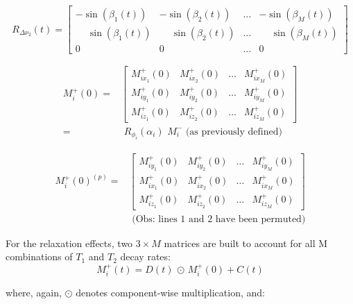 \begin{equation}
    R_{\Delta \nu_2}(t)  = \begin{bmatrix} -\sin(\beta_{1}(t) ) & -\sin(\beta_{2}(t) ) & \dots & -\sin(\beta_{M}(t) ) \\
    \phantom{-}\sin(\beta_{1}(t) ) & \phantom{-}\sin(\beta_{2}(t) ) & \dots & \phantom{-}\sin(\beta_{M}(t) ) \\
    0     &      0      & \dots &      0
    \end{bmatrix}
\end{equation}

\begin{equation}
\begin{split}
    M^{+}_i(0) = &
    \begin{bmatrix}
        M^{+}_{ix_1}(0) & M^{+}_{ix_2}(0) & \dots & M^{+}_{ix_M}(0) \\
        M^{+}_{iy_1}(0) & M^{+}_{iy_2}(0) & \dots & M^{+}_{iy_M}(0) \\
        M^{+}_{iz_1}(0) & M^{+}_{iz_2}(0) & \dots & M^{+}_{iz_M}(0)
    \end{bmatrix} \\
    = & \, \, R_{\phi_i}(\alpha_i) \, \, M^{-}_i \text{ (as previously defined)}
\end{split}
\end{equation}

\begin{equation}
\begin{split}
    M^{+}_i(0)^{(p)} = &
    \begin{bmatrix}
        M^{+}_{iy_1}(0) & M^{+}_{iy_2}(0) & \dots & M^{+}_{iy_M}(0) \\
        M^{+}_{ix_1}(0) & M^{+}_{ix_2}(0) & \dots & M^{+}_{ix_M}(0) \\
        M^{+}_{iz_1}(0) & M^{+}_{iz_2}(0) & \dots & M^{+}_{iz_M}(0)
    \end{bmatrix} \\
    & \text{ (Obs: lines 1 and 2 have been permuted)}
\end{split}
\end{equation}

For the relaxation effects, two $3 \times M$ matrices are built to account for all M combinations of $T_1$ and $T_2$ decay rates:
\begin{equation}
    M^{+}_i(t) = D(t)  \, \odot \, M^{+}_i(0) + C(t) 
\end{equation}

where, again, $\odot$ denotes component-wise multiplication, and:

